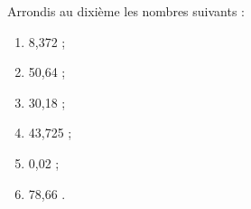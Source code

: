 \begin{exercice}
Arrondis au dixième les nombres suivants :
\begin{enumerate}
 \item 8,372 \dotfill ; 
 
 \item 50,64 \dotfill ; 
 
 \item 30,18 \dotfill ; 
 
 \item 43,725 \dotfill ; 
 
 \item 0,02 \dotfill ; 
 
 \item 78,66 \dotfill. 
 
 \end{enumerate}
\end{exercice}




